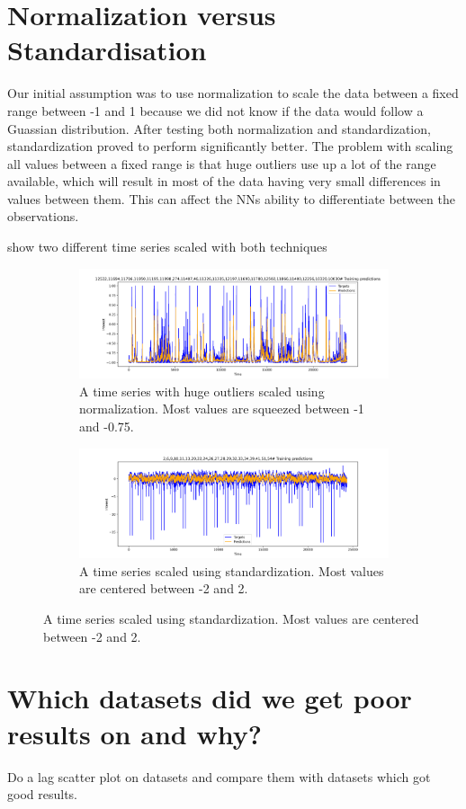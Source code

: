 \section{Normalization versus Standardisation}
Our initial assumption was to use normalization to scale the data between a
fixed range between -1 and 1 because we did not know if the data would follow a Guassian
distribution. After testing both normalization and standardization,
standardization proved to perform significantly better.
The problem with scaling all values between a fixed range is that huge
outliers use up a lot of the range available, which will result in
most of the data having very small differences in values between them.
This can affect the NNs ability to differentiate between the observations.

 show two different time series
scaled with both techniques
\begin{figure}[h!]
  \centering
  \caption{Effects of different scaling techniques on a dataset with huge outliers.}
  \label{fig:time-series-standardization-vs-normalization}
  \begin{subfigure}[b]{0.49\textwidth}
    \includegraphics[width=\textwidth]{./figs/dataset/time-series_scaled_normalization2.png}
    \hfill
    \caption{A time series with huge outliers scaled using normalization. Most values are squeezed between -1 and -0.75.}
    \label{fig:time-series-normalization}
  \end{subfigure}
  \begin{subfigure}[b]{0.49\textwidth}
    \includegraphics[width=\textwidth]{./figs/dataset/time-series_scaled_standardization.png}
    \hfill
    \caption{A time series scaled using standardization. Most values are centered between -2 and 2.}
    \label{fig:time-series-standardization}
  \end{subfigure}
\end{figure}

\section{Which datasets did we get poor results on and why?}
Do a lag scatter plot on datasets and compare them with datasets which got good results.